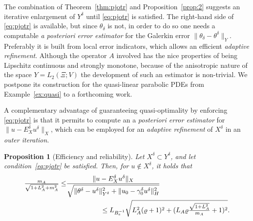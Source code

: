 \documentclass{amsart}
\newtheorem{proposition}[theorem]{Proposition}
\numberwithin{equation}{section}
\newcommand{\1}{\mathbb 1}
\begin{document}
The combination of Theorem~\ref{thm:pjotr} and Proposition~\ref{prop:2} suggests an iterative enlargement of $Y^\delta$ until \eqref{eq:pjotr} is satisfied.
The right-hand side of \eqref{eq:pjotr} is available, but since $\theta_\delta$ is not, in order to do so 
one needs a computable \emph{a posteriori error estimator} for the Galerkin error $\|\theta_\delta-\theta^\delta\|_Y$.
Preferably it is built from local error indicators, which allows an efficient \emph{adaptive refinement}.
Although the operator $A$ involved has the nice properties of being Lipschitz continuous and strongly monotone, because of the anisotropic nature of the space $Y=L_2(\Xi;V)$ the development of such an estimator is non-trivial. We postpone its construction for the quasi-linear parabolic PDEs from Example~\ref{ex:quasi} to a forthcoming work.
\medskip

A complementary advantage of guaranteeing quasi-optimality by enforcing \eqref{eq:pjotr} is 
that it permits to compute an a \emph{posteriori error estimator} for $\|u-E_X^\delta u^\delta\|_X$, which can be employed for an \emph{adaptive refinement} of $X^\delta$ in an \emph{outer iteration}.

\begin{proposition}[Efficiency and reliability] \label{prop:5} Let $X^\delta \subset Y^\delta$, and let condition~\eqref{eq:pjotr} be satisfied. Then, for $u \not\in X^\delta$, it holds that
\begin{align*}
\tfrac{m_A}{\sqrt{1+L_A^2 +m_A^2}} \leq &\frac{\|u-E_X^\delta u^\delta\|_X}{\sqrt{\|\theta^\delta-u^\delta\|_{Y^\delta}^2+\|u_0-\gamma^\delta_0 u^\delta\|_H^2}}\\
&\hspace*{5em} \leq L_{B_e^{-1}}
\sqrt{L_A^2(\varrho+1)^2+(L_A \varrho \tfrac{\sqrt{1+L_A^2}}{m_A}+1)^2}.
\end{align*}
\end{proposition}
\end{document}

